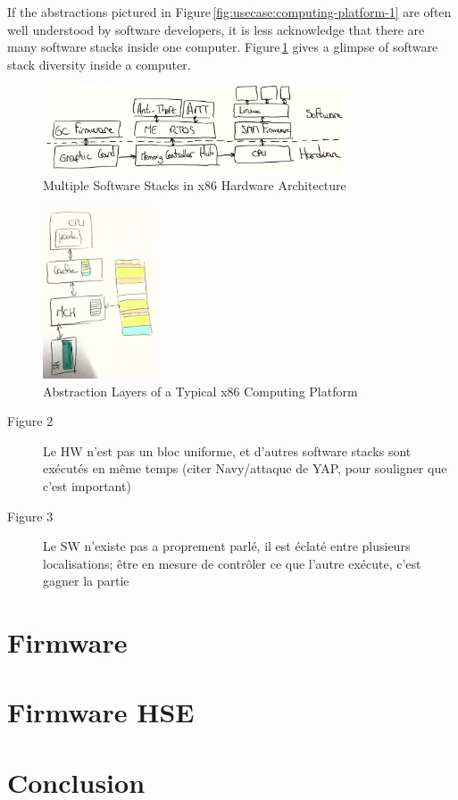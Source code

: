 If the abstractions pictured in Figure\,\ref{fig:usecase:computing-platform-1}
are often well understood by software developers, it is less acknowledge that
there are many software stacks inside one computer.
%
Figure\,\ref{fig:usecase:computing-platform-2} gives a glimpse of software stack
diversity inside a computer.

\begin{figure}
  \centering
  \includegraphics[width=0.8\textwidth]{Figures/intro-computing-platform.jpg}
  \caption{Multiple Software Stacks in x86 Hardware Architecture}
  \label{fig:usecase:computing-platform-2}
\end{figure}

\begin{figure}
  \centering
  \includegraphics[width=0.3\textwidth]{Figures/computing-platform-3.jpg}
  \caption{Abstraction Layers of a Typical x86 Computing Platform}
  \label{fig:usecase:computing-platform-3}
\end{figure}


\begin{description}
\item [Figure 2] Le HW n’est pas un bloc uniforme, et d’autres software stacks
  sont exécutés en même temps (citer Navy/attaque de YAP, pour souligner que
  c’est important)
\item [Figure 3] Le SW n'existe pas a proprement parlé, il est éclaté entre
  plusieurs localisations; être en mesure de contrôler ce que l’autre exécute,
  c’est gagner la partie
\end{description}


\section{Firmware}
\label{sec:usecase:firmware}

\section{Firmware HSE}
\label{sec:usecase:hse}

\section{Conclusion}
\label{sec:usecase:conclusion}
